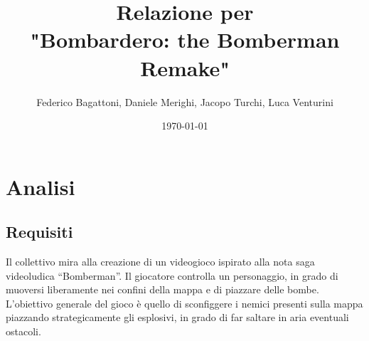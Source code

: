 \documentclass[a4paper,12pt]{report}
\title{Relazione per\\"Bombardero: the Bomberman Remake"}
\author{Federico Bagattoni, Daniele Merighi, Jacopo Turchi, Luca Venturini}
\date{\today}
\begin{document}
\maketitle

\tableofcontents

\chapter{Analisi}
\section{Requisiti}
Il collettivo mira alla creazione di un videogioco ispirato alla nota saga videoludica “Bomberman”.
Il giocatore controlla un personaggio, in grado di muoversi liberamente nei confini della mappa e di piazzare delle bombe. L’obiettivo generale del gioco è quello di sconfiggere i nemici presenti sulla mappa piazzando strategicamente gli esplosivi, in grado di far saltare in aria eventuali ostacoli.
\end{document}
